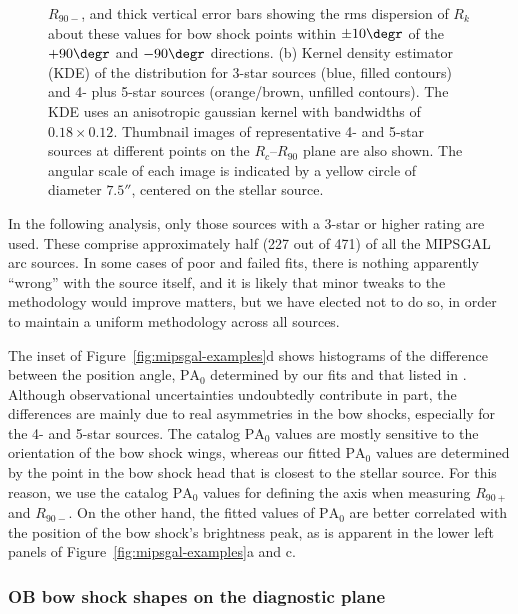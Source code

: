 \begin{figure}
{    \(R_{90-}\), and thick vertical error bars showing the rms
    dispersion of \(R_k\) about these values for bow shock points
    within \(\pm 10\degr\) of the \(+90\degr\) and \(-90\degr\)
    directions.  (b) Kernel density estimator (KDE) of the
    distribution for 3-star sources (blue, filled contours) and 4-
    plus 5-star sources (orange/brown, unfilled contours).  The KDE
    uses an anisotropic gaussian kernel with bandwidths of
    \(0.18 \times 0.12\). Thumbnail images of representative 4- and 5-star
    sources at different points on the \(R_c\)--\(R_{90}\) plane are
    also shown. The angular scale of each image is indicated by a
    yellow circle of diameter \(7.5''\), centered on the stellar
    source.}
  \label{fig:mipsgal-shapes}
\end{figure}

In the following analysis, only those sources with a 3-star or higher
rating are used.  These comprise approximately half (227 out of 471)
of all the MIPSGAL arc sources.  In some cases of poor and failed
fits, there is nothing apparently ``wrong'' with the source itself,
and it is likely that minor tweaks to the methodology would improve
matters, but we have elected not to do so, in order to maintain a
uniform methodology across all sources.

The inset of Figure~\ref{fig:mipsgal-examples}d shows histograms of
the difference between the position angle, \(\text{PA}_0\) determined
by our fits and that listed in \citet{Kobulnicky:2016a}.  Although
observational uncertainties undoubtedly contribute in part, the
differences are mainly due to real asymmetries in the bow shocks,
especially for the 4- and 5-star sources.  The
\citeauthor{Kobulnicky:2016a} catalog \(\text{PA}_0\) values are
mostly sensitive to the orientation of the bow shock wings, whereas
our fitted \(\text{PA}_0\) values are determined by the point in the
bow shock head that is closest to the stellar source.  For this
reason, we use the catalog \(\text{PA}_0\) values for defining the
axis when measuring \(R_{90+}\) and \(R_{90-}\). On the other hand,
the fitted values of \(\text{PA}_0\) are better correlated with the
position of the bow shock's brightness peak, as is apparent in the
lower left panels of Figure~\ref{fig:mipsgal-examples}a and c.

\subsubsection{OB bow shock shapes on the diagnostic plane}
\label{sec:ob-shapes}

